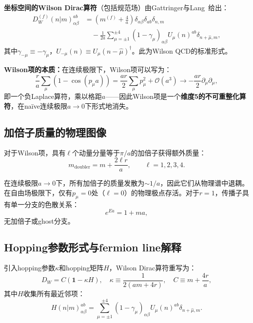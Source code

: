 \documentclass[12pt,a4paper]{ctexart}
\theoremstyle{definition}
\begin{document}
\textbf{坐标空间的Wilson Dirac算符}（包括规范场）由Gattringer与Lang~\cite{GattringerLang2010}给出：
\begin{equation}
\begin{aligned}
D_W^{(f)}(n|m)^{ab}_{\alpha\beta} &= \left(m^{(f)} + \frac{4}{a}\right) \delta_{\alpha\beta}\delta_{ab}\delta_{n,m} \\
&\quad - \frac{1}{2a}\sum_{\mu=\pm 1}^{\pm 4} (1 - \gamma_\mu)_{\alpha\beta} U_\mu(n)^{ab} \delta_{n+\hat\mu,m},
\label{eq:wilson_position}
\end{aligned}
\end{equation}
其中$\gamma_{-\mu} \equiv -\gamma_\mu$，$U_{-\mu}(n) \equiv U_\mu(n-\hat\mu)^\dagger$。此为Wilson QCD的标准形式。

\textbf{Wilson项的本质：}在连续极限下，Wilson项可以写为：
\begin{equation}
\frac{r}{a}\sum_\mu (1 - \cos(p_\mu a)) = \frac{ar}{2}\sum_\mu p_\mu^2 + \mathcal{O}(a^3) \to -\frac{ar}{2}\partial_\mu\partial_\mu,
\label{eq:wilson_term_continuum}
\end{equation}
即一个负Laplace算符，乘以格距$a$——因此Wilson项是一个\textbf{维度5的不可重整化算符}，在na\"ive连续极限$a\to 0$下形式地消失。

\subsection{加倍子质量的物理图像}

对于Wilson项，具有$\ell$个动量分量等于$\pi/a$的加倍子获得额外质量：
\begin{equation}
m_{\text{doubler}} = m + \frac{2\ell r}{a}, \qquad \ell = 1,2,3,4.
\label{eq:doubler_mass}
\end{equation}

在连续极限$a\to 0$下，所有加倍子的质量发散为$\sim 1/a$，因此它们从物理谱中退耦。在自由场极限下，仅有$p_\mu=0$处（$\ell=0$）的物理极点存活。对于$r=1$，传播子具有单一分支的色散关系：
\begin{equation}
e^{Ea} = 1 + ma,
\label{eq:wilson_dispersion}
\end{equation}
无加倍子或ghost分支。

\subsection{Hopping参数形式与fermion line解释}

引入hopping参数$\kappa$和hopping矩阵$H$，Wilson Dirac算符重写为：
\begin{equation}
D_W = C(\mathbf{1} - \kappa H), \quad \kappa \equiv \frac{1}{2(am+4r)}, \quad C \equiv m + \frac{4r}{a},
\label{eq:hopping_form}
\end{equation}
其中$H$收集所有最近邻项：
\begin{equation}
H(n|m)_{\alpha\beta}^{ab} = \sum_{\mu=\pm 1}^{\pm 4} (1-\gamma_\mu)_{\alpha\beta} U_\mu(n)^{ab} \delta_{n+\hat\mu,m}.
\label{eq:hopping_matrix}
\end{equation}
\end{document}
